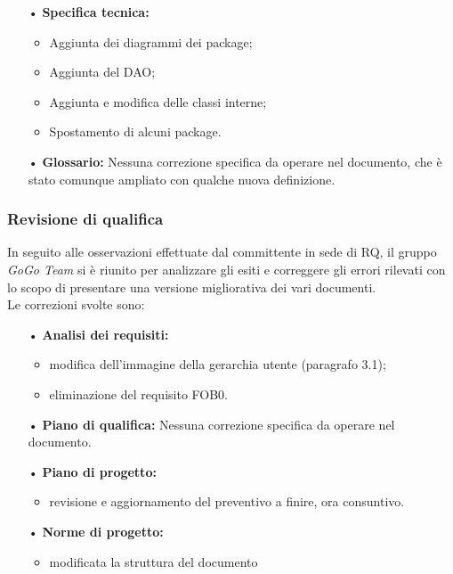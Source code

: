 {{{\begin{itemize}
			\item[•] \textbf{Specifica tecnica:}
				\begin{itemize}
					\item Aggiunta dei diagrammi dei package;
					\item Aggiunta del DAO;
					\item Aggiunta e modifica delle classi interne;
					\item Spostamento di alcuni package.
				\end{itemize} 
			\item[•] \textbf{Glossario:} Nessuna correzione specifica da operare nel documento, che è stato comunque
				ampliato con qualche nuova definizione.
			
		\end{itemize}
	}
	
	\subsubsection{Revisione di qualifica}{

	In seguito alle osservazioni effettuate dal committente in sede di RQ, il gruppo
	\textit{GoGo Team} si è riunito per analizzare gli esiti e correggere gli errori 
	rilevati con lo scopo di presentare una versione migliorativa dei vari
	documenti.\\
	Le correzioni svolte sono:
		\begin{itemize}
		
			\item[•] \textbf{Analisi dei requisiti:}
				\begin{itemize}
					\item modifica dell'immagine della gerarchia utente (paragrafo 3.1);
					\item eliminazione del requisito FOB0.
				\end{itemize}
			
			\item[•] \textbf{Piano di qualifica:}  Nessuna correzione specifica da operare nel documento.
			
			\item[•] \textbf{Piano di progetto:}
				\begin{itemize}
					\item revisione e aggiornamento del preventivo a finire, ora consuntivo.
				\end{itemize}
			
			\item[•] \textbf{Norme di progetto:}
				\begin{itemize}
					\item modificata la struttura del documento
				\end{itemize}
			

\end{itemize}}}}
